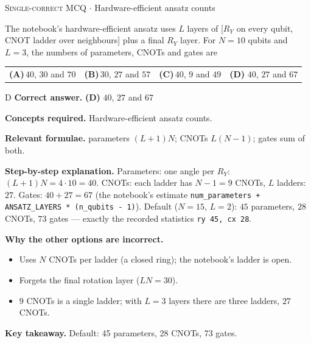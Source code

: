 \documentclass[11pt,a4paper]{article}
\newcommand{\optlabel}[1]{\textbf{(#1)}}
\newcommand{\correctlabel}[1]{\textcolor{okgreen}{\textbf{(#1)}\,\ding{51}}}
\newenvironment{qitem}[1]{\begin{list}{}{\setlength{\leftmargin}{3.3em}\setlength{\labelwidth}{3.1em}%
  \setlength{\labelsep}{0.2em}\setlength{\topsep}{3pt}\setlength{\parsep}{3pt}}\item[\textbf{Q.#1}\hfill]}{\end{list}}
\newcommand{\qsep}{\par\vspace{2pt}{\color{black!15}\hrule}\vspace{4pt}}
\newcommand{\qmeta}[2]{{\footnotesize\color{black!60}\textsc{#1} \;$\cdot$\; #2}\par}
\begin{document}
\begin{qitem}{43}
\qmeta{Single-correct MCQ}{Hardware-efficient ansatz counts}
The notebook's hardware-efficient ansatz uses $L$ layers of [$R_Y$ on every qubit, CNOT ladder over neighbours] plus a final $R_Y$ layer. For
$N = 10$ qubits and $L = 3$, the numbers of parameters, CNOTs and gates are
\par\smallskip\noindent\begin{tabularx}{\linewidth}{@{}*{4}{L}@{}}
\optlabel{A}\,$40$, $30$ and $70$ & \optlabel{B}\,$30$, $27$ and $57$ & \optlabel{C}\,$40$, $9$ and $49$ & \correctlabel{D}\,$40$, $27$ and $67$
\end{tabularx}
\end{qitem}
\begin{solbox}{D}
\textbf{\color{brand}Correct answer.} \textcolor{okgreen}{\textbf{(D)}} $40$, $27$ and $67$

\textbf{\color{brand}Concepts required.} Hardware-efficient ansatz counts.

\textbf{\color{brand}Relevant formulae.} parameters $(L+1)N$; CNOTs $L(N-1)$; gates sum of both.

\textbf{\color{brand}Step-by-step explanation.} Parameters: one angle per $R_Y$: $(L + 1)N = 4\cdot10 = 40$. CNOTs: each ladder has $N - 1 = 9$ CNOTs, $L$ ladders: $27$.
Gates: $40 + 27 = 67$ (the notebook's estimate \texttt{num\_parameters + ANSATZ\_LAYERS * (n\_qubits - 1)}).
Default ($N = 15$, $L = 2$): $45$ parameters, $28$ CNOTs, $73$ gates --- exactly the recorded statistics \texttt{ry 45, cx 28}.

\textbf{\color{brand}Why the other options are incorrect.}
\begin{itemize}[leftmargin=2.4em, itemsep=1pt, topsep=2pt]
\item[\textbf{(A)}] Uses $N$ CNOTs per ladder (a closed ring); the notebook's ladder is open.
\item[\textbf{(B)}] Forgets the final rotation layer ($LN = 30$).
\item[\textbf{(C)}] $9$ CNOTs is a single ladder; with $L = 3$ layers there are three ladders, $27$ CNOTs.
\end{itemize}
\textbf{\color{brand}Key takeaway.} Default: 45 parameters, 28 CNOTs, 73 gates.
\end{solbox}
\qsep
\end{document}
